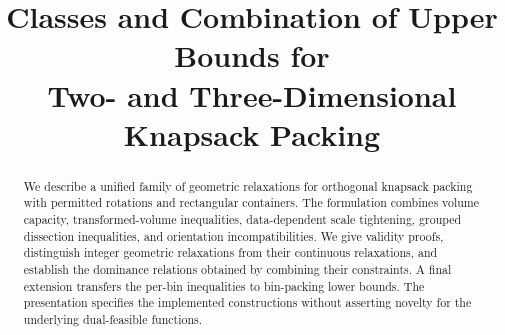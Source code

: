 \documentclass[11pt,a4paper]{article}
\title{Classes and Combination of Upper Bounds for\protect\\
Two- and Three-Dimensional Knapsack Packing}
\author{}
\date{}
\begin{document}
\maketitle
\begin{abstract}
We describe a unified family of geometric relaxations for orthogonal
knapsack packing with permitted rotations and rectangular containers.
The formulation combines volume capacity, transformed-volume inequalities,
data-dependent scale tightening, grouped dissection inequalities, and
orientation incompatibilities. We give validity proofs, distinguish
integer geometric relaxations from their continuous relaxations, and
establish the dominance relations obtained by combining their constraints.
A final extension transfers the per-bin inequalities to bin-packing
lower bounds. The presentation specifies the implemented constructions
without asserting novelty for the underlying dual-feasible functions.
\end{abstract}



\end{document}
